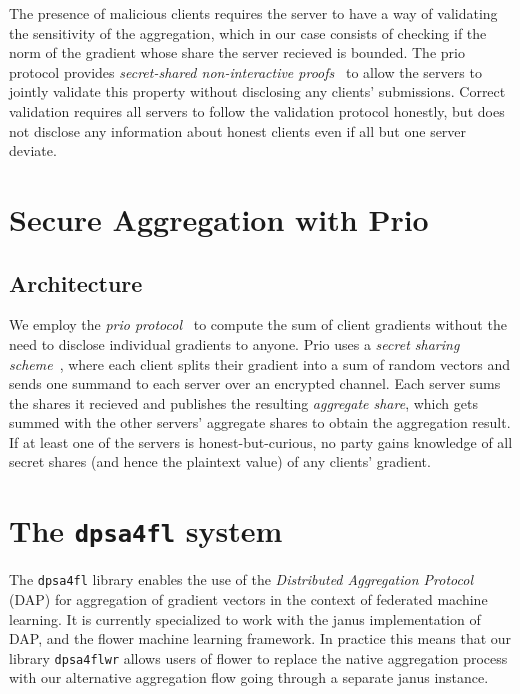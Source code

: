 \documentclass{article}
\begin{document}
The presence of malicious clients requires the server to have a way of validating the sensitivity of the aggregation, which in our case consists of checking if the norm of the gradient whose share the server recieved is bounded. The prio protocol provides \textit{secret-shared non-interactive proofs}~\cite[Section 4]{prio} to allow the servers to jointly validate this property without disclosing any clients' submissions. Correct validation requires all servers to follow the validation protocol honestly, but does not disclose any information about honest clients even if all but one server deviate.

\section{Secure Aggregation with Prio}

\subsection{Architecture}
We employ the \textit{prio protocol}~\cite{prio} to compute the sum of client gradients without the need to disclose individual gradients to anyone. Prio uses a \textit{secret sharing scheme}~\cite[Step 1 of scheme on page 3]{prio}, where each client splits their gradient into a sum of random vectors and sends one summand to each server over an encrypted channel. Each server sums the shares it recieved and publishes the resulting \textit{aggregate share}, which gets summed with the other servers' aggregate shares to obtain the aggregation result. If at least one of the servers is honest-but-curious, no party gains knowledge of all secret shares (and hence the plaintext value) of any clients' gradient.




\section{The \texttt{dpsa4fl} system}
The \texttt{dpsa4fl} library enables the use of the \textit{Distributed Aggregation Protocol} (DAP) for
aggregation of gradient vectors in the context of federated machine learning. It
is currently specialized to work with the janus implementation of DAP,
and the flower machine learning framework.
In practice this means that our library \texttt{dpsa4flwr} allows users of flower
to replace the native aggregation process with our alternative aggregation flow
going through a separate janus instance.
\end{document}
